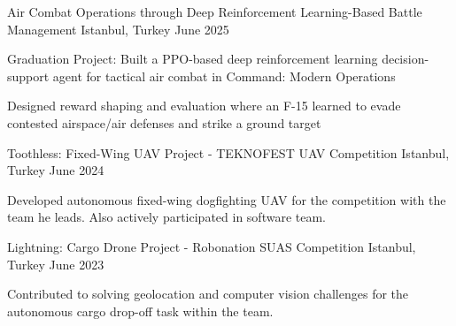 \begin{cventries}

\cventry
    {} %
    {Air Combat Operations through Deep Reinforcement Learning-Based Battle Management} %
    {Istanbul, Turkey} %
    {June 2025} %
    {
      \begin{cvitems} %
        \item {Graduation Project: Built a PPO-based deep reinforcement learning decision-support agent for tactical air combat in Command: Modern Operations}
        \item {Designed reward shaping and evaluation where an F-15 learned to evade contested airspace/air defenses and strike a ground target}
      \end{cvitems}
    }
\cventry
    {} %
    {Toothless: Fixed-Wing UAV Project - TEKNOFEST UAV Competition} %
    {Istanbul, Turkey} %
    {June 2024} %
    {
      \begin{cvitems} %
        \item {Developed autonomous fixed-wing dogfighting UAV for the competition with the team he leads. Also actively participated in software team.}
      \end{cvitems}
    }

\cventry
    {} %
    {Lightning: Cargo Drone Project - Robonation SUAS Competition} %
    {Istanbul, Turkey} %
    {June 2023} %
    {
      \begin{cvitems} %
        \item {Contributed to solving geolocation and computer vision challenges for the autonomous cargo drop-off task within the team.}
      \end{cvitems}
    }





\end{cventries}
